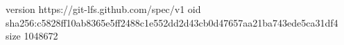 version https://git-lfs.github.com/spec/v1
oid sha256:c5828ff10ab8365e5ff2488c1e552dd2d43cb0d47657aa21ba743ede5ca31df4
size 1048672
